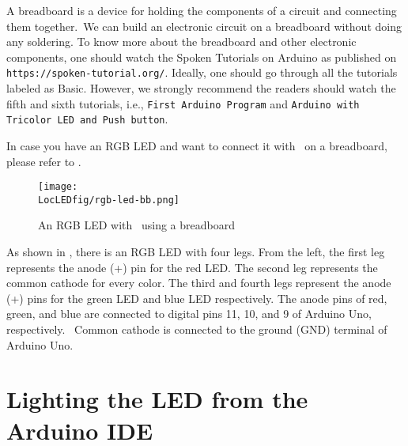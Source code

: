 A breadboard is a device for holding the components of a circuit and connecting 
them together. We can build an electronic circuit on a breadboard without doing any 
soldering. To know more about the breadboard and other electronic components, 
one should watch the Spoken Tutorials on Arduino as published on
{\tt https://spoken-tutorial.org/}. Ideally, one should go through all the
tutorials labeled as Basic. However, we strongly recommend the readers should
watch the fifth and sixth tutorials, i.e., {\tt First Arduino Program} and 
{\tt Arduino with Tricolor LED and Push button}.

In case you have an RGB LED and want to connect it with \arduino\ on a breadboard, 
please refer to . 
\begin{figure}
  \centering
  \texttt{[image: \\LocLEDfig/rgb-led-bb.png]}
  \caption{An RGB LED with \arduino\ using a breadboard}
  \label{fig:ard-rgb-bread}
\end{figure}
As shown in , there is an RGB LED with four legs. 
From the left, the first leg represents the anode (+) pin for the red LED. 
The second leg represents the common cathode for every color. 
The third and fourth legs represent the anode (+) pins for the green LED and blue LED respectively. 
The anode pins of red, green, and blue are connected to digital pins 11, 10, and 9 of Arduino Uno, respectively. 
Common cathode is connected to the ground (GND) terminal of Arduino Uno. 

\section{Lighting the LED from the Arduino IDE}

